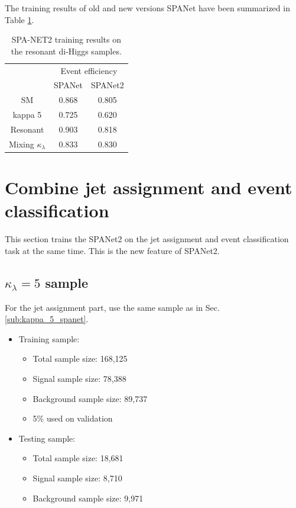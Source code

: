 \documentclass[12pt]{article}
\begin{document}
		The training results of old and new versions SPANet have been summarized in Table \ref{tab:training_results_of_SPANET_12}.
		\begin{table}[htpb]
			\centering
			\caption{SPA-NET2 training results on the resonant di-Higgs samples.}
			\label{tab:training_results_of_SPANET_12}
			\begin{tabular}{c|cc}
						 & \multicolumn{2}{c}{Event efficiency} \\
						 & SPANet           & SPANet2           \\ \hline
			SM           & 0.868            & 0.805             \\
			kappa 5      & 0.725            & 0.620             \\
			Resonant     & 0.903            & 0.818             \\
			Mixing $\kappa_\lambda$& 0.833            & 0.830            
			\end{tabular}
		\end{table}


\section{Combine jet assignment and event classification}%
\label{sec:combine_jet_assignment_and_event_classification}
	This section trains the SPANet2 on the jet assignment and event classification task at the same time. This is the new feature of SPANet2.
	\subsection{\texorpdfstring{$\kappa_\lambda=5$}{kappa 5} sample}%
	\label{sub:kappa_5_sample}
		For the jet assignment part, use the same sample as in Sec. \ref{sub:kappa_5_spanet}. 
		\begin{itemize}
			\item Training sample:
			\begin{itemize}
				\item Total sample size: 168,125
				\item Signal sample size: 78,388
				\item Background sample size: 89,737
				\item 5\% used on validation
			\end{itemize}
			\item Testing sample:
			\begin{itemize}
				\item Total sample size: 18,681
				\item Signal sample size: 8,710
				\item Background sample size: 9,971
			\end{itemize}
		\end{itemize}
\end{document}
